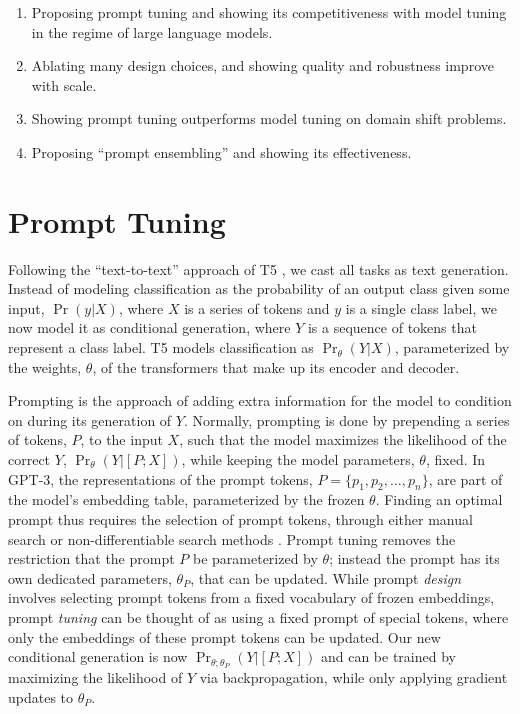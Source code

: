 \documentclass[11pt]{article}
\begin{document}
\begin{enumerate} [topsep=3pt,itemsep=-1ex,partopsep=1ex,parsep=1ex]
\item Proposing prompt tuning and showing its competitiveness with model tuning in the regime of large language models.
\item Ablating many design choices, and showing quality and robustness improve with scale.
\item Showing prompt tuning outperforms model tuning on domain shift problems.
\item Proposing ``prompt ensembling'' and showing its effectiveness.
\end{enumerate}

\section{Prompt Tuning}
\label{sec:tuning}

Following the ``text-to-text'' approach of T5 \cite{raffel_2020_t5}, we cast all tasks as text generation. Instead of modeling classification as the probability of an output class given some input, $\Pr(y|X)$, where $X$ is a series of tokens and $y$ is a single class label, we now model it as conditional generation, where $Y$ is a sequence of tokens that represent a class label. T5 models classification as $\Pr_{\theta}(Y | X)$, parameterized by the weights, $\theta$, of the transformers \cite{vaswani2017attention} that make up its encoder and decoder.

Prompting is the approach of adding extra information for the model to condition on during its generation of $Y$. Normally, prompting is done by prepending a series of tokens, $P$, to the input $X$, such that the model maximizes the likelihood of the correct $Y$, $\Pr_{\theta}(Y|[P;X])$, while keeping the model parameters, $\theta$, fixed. In \mbox{GPT-3}, the representations of the prompt tokens, $P = \{p_1, p_2, \dots, p_n\}$, are part of the model's embedding table, parameterized by the frozen $\theta$. Finding an optimal prompt thus requires the selection of prompt tokens, through either manual search or non-differentiable search methods \cite{jiang-etal-2020-know,shin-etal-2020-autoprompt}. Prompt tuning removes the restriction that the prompt $P$ be parameterized by $\theta$; instead the prompt has its own dedicated parameters, $\theta_P$, that can be updated. While prompt \emph{design} involves selecting prompt tokens from a fixed vocabulary of frozen embeddings, prompt \emph{tuning} can be thought of as using a fixed prompt of special tokens, where only the embeddings of these prompt tokens can be updated. Our new conditional generation is now $\Pr_{\theta;\theta_P}(Y | [P;X])$ and can be trained by maximizing the likelihood of $Y$ via backpropagation, while only applying gradient updates to $\theta_P$.
\end{document}
